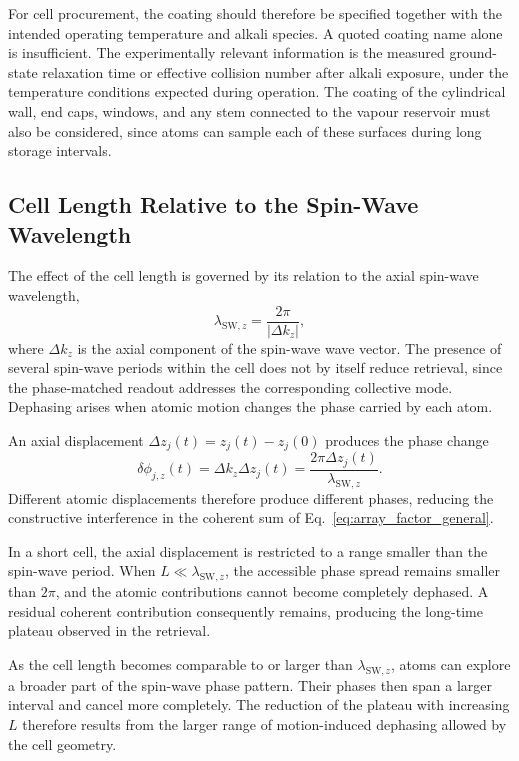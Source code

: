 For cell procurement, the coating should therefore be specified together with the intended operating temperature and alkali species. A quoted coating name alone is insufficient. The experimentally relevant information is the measured ground-state relaxation time or effective collision number after alkali exposure, under the temperature conditions expected during operation. The coating of the cylindrical wall, end caps, windows, and any stem connected to the vapour reservoir must also be considered, since atoms can sample each of these surfaces during long storage intervals.

\subsection{Cell Length Relative to the Spin-Wave Wavelength}
\label{sec:results_cell_length_spin_wave}

The effect of the cell length is governed by its relation to the axial spin-wave wavelength,
\begin{equation}
    \lambda_{\mathrm{SW},z}
    =
    \frac{2\pi}{|\Delta k_z|},
    \label{eq:results_axial_spin_wave_wavelength}
\end{equation}
where $\Delta k_z$ is the axial component of the spin-wave wave vector. The presence of several spin-wave periods within the cell does not by itself reduce retrieval, since the phase-matched readout addresses the corresponding collective mode. Dephasing arises when atomic motion changes the phase carried by each atom.

An axial displacement $\Delta z_j(t)=z_j(t)-z_j(0)$ produces the phase change
\begin{equation}
    \delta\phi_{j,z}(t)
    =
    \Delta k_z\Delta z_j(t)
    =
    \frac{2\pi\Delta z_j(t)}
         {\lambda_{\mathrm{SW},z}}.
    \label{eq:results_axial_motion_phase}
\end{equation}
Different atomic displacements therefore produce different phases, reducing the constructive interference in the coherent sum of Eq.~\eqref{eq:array_factor_general}.

In a short cell, the axial displacement is restricted to a range smaller than the spin-wave period. When $L\ll\lambda_{\mathrm{SW},z}$, the accessible phase spread remains smaller than $2\pi$, and the atomic contributions cannot become completely dephased. A residual coherent contribution consequently remains, producing the long-time plateau observed in the retrieval.

As the cell length becomes comparable to or larger than $\lambda_{\mathrm{SW},z}$, atoms can explore a broader part of the spin-wave phase pattern. Their phases then span a larger interval and cancel more completely. The reduction of the plateau with increasing $L$ therefore results from the larger range of motion-induced dephasing allowed by the cell geometry.
